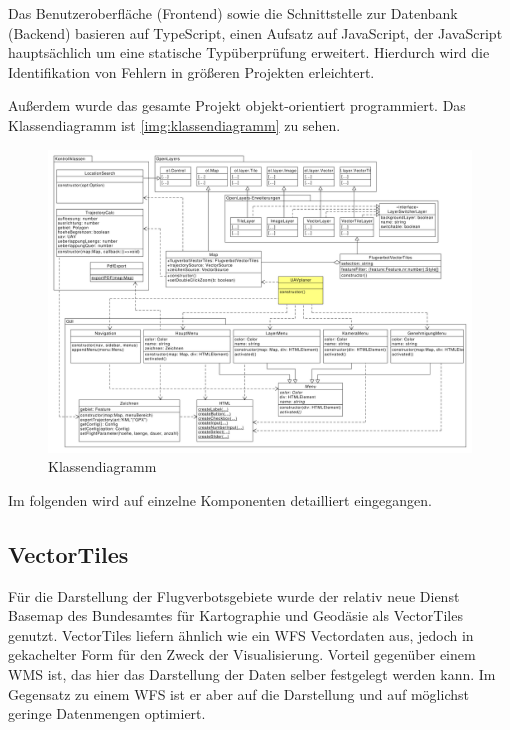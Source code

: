 \documentclass[a4paper,12pt,bibliography=totoc, listof=totoc,titlepage]{scrartcl}
\begin{document}
Das Benutzeroberfläche (Frontend) sowie die Schnittstelle zur Datenbank (Backend) basieren auf TypeScript, einen Aufsatz auf JavaScript, der JavaScript hauptsächlich um eine statische Typüberprüfung erweitert. Hierdurch wird die Identifikation von Fehlern in größeren Projekten erleichtert. \citep[S. 3]{typescript}

Außerdem wurde das gesamte Projekt objekt-orientiert programmiert. Das Klassendiagramm ist \autoref{img:klassendiagramm} zu sehen.

\begin{figure} %
 \centering
 \includegraphics[width=1\textwidth]{./img/klassendiagramm.pdf}
\centering
 \caption{Klassendiagramm} %
 \label{img:klassendiagramm} %
\end{figure}

Im folgenden wird auf einzelne Komponenten detailliert eingegangen.

\subsection{VectorTiles}
Für die Darstellung der Flugverbotsgebiete wurde der relativ neue Dienst Basemap des Bundesamtes für Kartographie und Geodäsie als VectorTiles genutzt. VectorTiles liefern ähnlich wie ein WFS Vectordaten aus, jedoch in gekachelter Form für den Zweck der Visualisierung. Vorteil gegenüber einem WMS ist, das hier das Darstellung der Daten selber festgelegt werden kann. Im Gegensatz zu einem WFS ist er aber auf die Darstellung und auf möglichst geringe Datenmengen optimiert.
\end{document}
